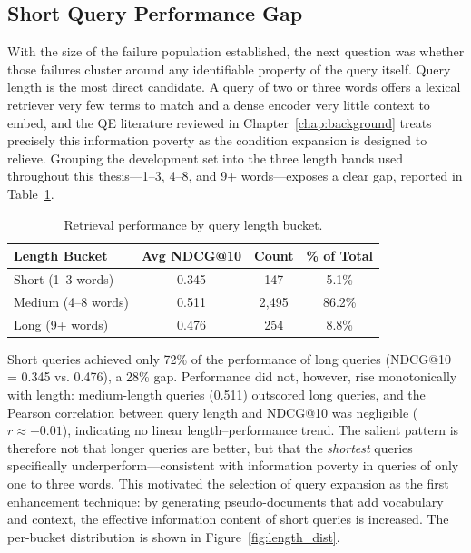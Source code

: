 \subsection{Short Query Performance Gap}
\label{sec:res_error_length}

With the size of the failure population established, the next question was whether those failures cluster around any identifiable property of the query itself. Query length is the most direct candidate. A query of two or three words offers a lexical retriever very few terms to match and a dense encoder very little context to embed, and the QE literature reviewed in Chapter~\ref{chap:background} treats precisely this information poverty as the condition expansion is designed to relieve. Grouping the development set into the three length bands used throughout this thesis---1--3, 4--8, and 9+ words---exposes a clear gap, reported in Table~\ref{tab:query_length}.

\begin{table}[htbp]
    \centering
    \caption[Retrieval performance by query length]{Retrieval performance by query length bucket.}
    \label{tab:query_length}
    \begin{tabular}{@{}lccc@{}}
        \toprule
        \textbf{Length Bucket} & \textbf{Avg NDCG@10} & \textbf{Count} & \textbf{\% of Total} \\
        \midrule
        Short (1--3 words) & 0.345 & 147 & 5.1\% \\
        Medium (4--8 words) & 0.511 & 2,495 & 86.2\% \\
        Long (9+ words) & 0.476 & 254 & 8.8\% \\
        \bottomrule
    \end{tabular}
\end{table}

Short queries achieved only 72\% of the performance of long queries (NDCG@10 = 0.345 vs. 0.476), a 28\% gap. Performance did not, however, rise monotonically with length: medium-length queries (0.511) outscored long queries, and the Pearson correlation between query length and NDCG@10 was negligible ($r \approx -0.01$), indicating no linear length--performance trend. The salient pattern is therefore not that longer queries are better, but that the \emph{shortest} queries specifically underperform---consistent with information poverty in queries of only one to three words. This motivated the selection of query expansion as the first enhancement technique: by generating pseudo-documents that add vocabulary and context, the effective information content of short queries is increased. The per-bucket distribution is shown in Figure~\ref{fig:length_dist}.

